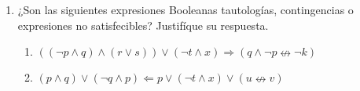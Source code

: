 \documentclass{article}
\begin{document}
\begin{enumerate}
	\item ¿Son las siguientes expresiones Booleanas tautologías, contingencias o expresiones no satisfecibles? Justifíque su respuesta.

	\begin{enumerate}
		\item $((¬p \land q) \land (r \lor s)) \lor (¬t \land x) \Rightarrow (q \land ¬p \nleftrightarrow ¬k)$
		
		\item $(p \land q) \lor (¬q \land p) \Leftarrow p \lor (¬t \land x) \lor (u \nleftrightarrow v)$
	\end{enumerate}

\end{enumerate}
\end{document}
